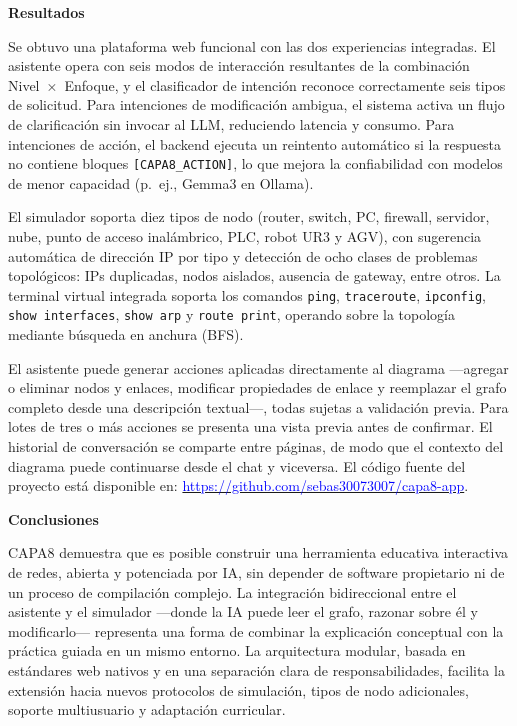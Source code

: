 \documentclass[12pt,letterpaper]{article}
\begin{document}
\textbf{Resultados}

Se obtuvo una plataforma web funcional con las dos experiencias integradas. El asistente opera con seis modos de interacción resultantes de la combinación Nivel~×~Enfoque, y el clasificador de intención reconoce correctamente seis tipos de solicitud. Para intenciones de modificación ambigua, el sistema activa un flujo de clarificación sin invocar al LLM, reduciendo latencia y consumo. Para intenciones de acción, el backend ejecuta un reintento automático si la respuesta no contiene bloques \texttt{[CAPA8\_ACTION]}, lo que mejora la confiabilidad con modelos de menor capacidad (p.~ej., Gemma3 en Ollama).

El simulador soporta diez tipos de nodo (router, switch, PC, firewall, servidor, nube, punto de acceso inalámbrico, PLC, robot UR3 y AGV), con sugerencia automática de dirección IP por tipo y detección de ocho clases de problemas topológicos: IPs duplicadas, nodos aislados, ausencia de gateway, entre otros. La terminal virtual integrada soporta los comandos \texttt{ping}, \texttt{traceroute}, \texttt{ipconfig}, \texttt{show interfaces}, \texttt{show arp} y \texttt{route print}, operando sobre la topología mediante búsqueda en anchura (BFS).

El asistente puede generar acciones aplicadas directamente al diagrama —agregar o eliminar nodos y enlaces, modificar propiedades de enlace y reemplazar el grafo completo desde una descripción textual—, todas sujetas a validación previa. Para lotes de tres o más acciones se presenta una vista previa antes de confirmar. El historial de conversación se comparte entre páginas, de modo que el contexto del diagrama puede continuarse desde el chat y viceversa. El código fuente del proyecto está disponible en: \href{https://github.com/sebas30073007/capa8-app}{\textcolor{blue}{https://github.com/sebas30073007/capa8-app}}.

\textbf{Conclusiones}

CAPA8 demuestra que es posible construir una herramienta educativa interactiva de redes, abierta y potenciada por IA, sin depender de software propietario ni de un proceso de compilación complejo. La integración bidireccional entre el asistente y el simulador —donde la IA puede leer el grafo, razonar sobre él y modificarlo— representa una forma de combinar la explicación conceptual con la práctica guiada en un mismo entorno. La arquitectura modular, basada en estándares web nativos y en una separación clara de responsabilidades, facilita la extensión hacia nuevos protocolos de simulación, tipos de nodo adicionales, soporte multiusuario y adaptación curricular.
\end{document}
